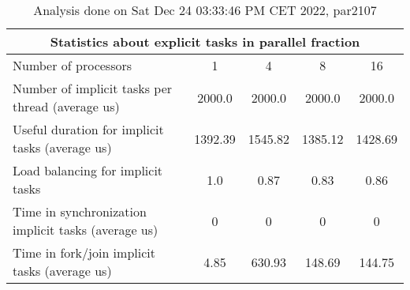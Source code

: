 \begin{table}[h]
\begin{center}
\begin{tabular}{|l|c|c|c|c|}
\hline
\multicolumn{5}{|c|}{Statistics about explicit tasks in parallel fraction} \\
\hline
\hline
Number of processors & 1 & 4 & 8 & 16 \\
\hline
\hline
Number of implicit tasks per thread (average us)    &          2000.0 &          2000.0 &          2000.0 &          2000.0 \\
\hline
Useful duration for implicit tasks (average us)     &         1392.39 &         1545.82 &         1385.12 &         1428.69 \\
\hline
Load balancing for implicit tasks                &             1.0 &            0.87 &            0.83 &            0.86 \\
\hline
Time in synchronization implicit tasks (average us) &               0 &               0 &               0 &               0 \\
\hline
Time in fork/join implicit tasks (average us)       &            4.85 &          630.93 &          148.69 &          144.75 \\
\hline
\end{tabular}
\end{center}
\caption{ Analysis done on Sat Dec 24 03:33:46 PM CET 2022, par2107}
\end{table}
